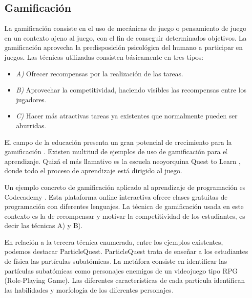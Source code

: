 \documentclass{llncs}
\begin{document}
\subsection{Gamificación}
\label{subsec:gamification}

La gamificación consiste en el uso de mecánicas de juego o pensamiento de juego en un contexto ajeno al juego, con el fin de conseguir determinados objetivos. La gamificación aprovecha la predisposición psicológica del humano a participar en juegos. Las técnicas utilizadas consisten básicamente en tres tipos:
\begin{itemize}
\item {\em A)} Ofrecer recompensas por la realización de las tareas. 
\item {\em B)} Aprovechar la competitividad, haciendo visibles las recompensas entre los jugadores.
\item {\em C)} Hacer más atractivas tareas ya existentes que normalmente pueden ser aburridas. 
\end{itemize}

El campo de la educación presenta un gran potencial de crecimiento para la gamificación \cite{lee2011gamification}. Existen multitud de ejemplos de uso de gamificación para el aprendizaje. Quizá el más llamativo es la escuela neoyorquina Quest to Learn \cite{salen2011quest}, donde todo el proceso de aprendizaje está dirigido al juego. 

Un ejemplo concreto de gamificación aplicado al aprendizaje de programación es Codecademy \cite{codecademy}. Esta plataforma online interactiva ofrece clases gratuitas de programación con diferentes lenguajes. La técnica de gamificación usada en este contexto es la de recompensar y motivar la competitividad de los estudiantes, es decir las técnicas A) y B). 

En relación a la tercera técnica enumerada, entre los ejemplos existentes, podemos destacar ParticleQuest. ParticleQuest trata de enseñar a los estudiantes de física las partículas subatómicas. La metáfora consiste en identificar las partículas subatómicas como personajes enemigos de un videojuego tipo RPG (Role-Playing Game). Las diferentes características de cada partícula identifican las habilidades y morfología de los diferentes personajes. 
\end{document}
